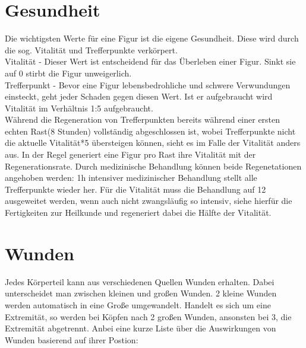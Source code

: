 \documentclass[a4paper,12pt,oneside]{book}
\begin{document}
\section{Gesundheit}
Die wichtigsten Werte für eine Figur ist die eigene Gesundheit. Diese wird durch die sog. Vitalität und Trefferpunkte verkörpert.
\\Vitalität - Dieser Wert ist entscheidend für das Überleben einer Figur. Sinkt sie auf 0 stirbt die Figur unweigerlich.
\\Trefferpunkt - Bevor eine Figur lebensbedrohliche und schwere Verwundungen einsteckt, geht jeder Schaden gegen diesen Wert. Ist er aufgebraucht wird Vitalität im Verhältnis 1:5 aufgebraucht.
\\Während die Regeneration von Trefferpunkten bereits während einer ersten echten Rast(8 Stunden) vollständig abgeschlossen ist, wobei Trefferpunkte nicht die aktuelle Vitalität*5 übersteigen können, sieht es im Falle der Vitalität anders aus. In der Regel generiert eine Figur pro Rast ihre Vitalität mit der Regenerationsrate. Durch medizinische Behandlung können beide Regenetationen angehoben werden: 1h intensiver medizinischer Behandlung stellt alle Trefferpunkte wieder her. Für die Vitalität muss die Behandlung auf 12 ausgeweitet werden, wenn auch nicht zwangsläufig so intensiv, siehe hierfür die Fertigkeiten zur Heilkunde und regeneriert dabei die Hälfte der Vitalität.

\section{Wunden}
Jedes Körperteil kann aus verschiedenen Quellen Wunden erhalten. Dabei unterscheidet man zwischen kleinen und großen Wunden. 2 kleine Wunden werden automatisch in eine Große umgewandelt. Handelt es sich um eine Extremität, so werden bei Köpfen nach 2 großen Wunden, ansonsten bei 3, die Extremität abgetrennt. Anbei eine kurze Liste über die Auswirkungen von Wunden basierend auf ihrer Postion:
\end{document}

